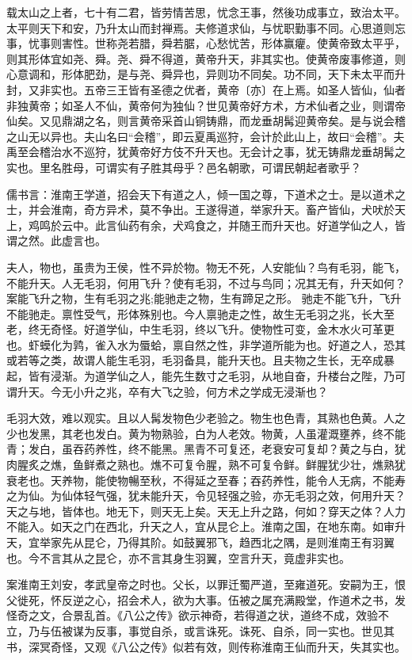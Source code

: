 \documentclass[]{article}
\begin{document}
载太山之上者，七十有二君，皆劳情苦思，忧念王事，然後功成事立，致治太平。太平则天下和安，乃升太山而封禅焉。夫修道求仙，与忧职勤事不同。心思道则忘事，忧事则害性。世称尧若腊，舜若腒，心愁忧苦，形体赢癯。使黄帝致太平乎，则其形体宜如尧、舜。尧、舜不得道，黄帝升天，非其实也。使黄帝废事修道，则心意调和，形体肥劲，是与尧、舜异也，异则功不同矣。功不同，天下未太平而升封，又非实也。五帝三王皆有圣德之优者，黄帝〔亦〕在上焉。如圣人皆仙，仙者非独黄帝；如圣人不仙，黄帝何为独仙？世见黄帝好方术，方术仙者之业，则谓帝仙矣。又见鼎湖之名，则言黄帝采首山铜铸鼎，而龙垂胡髯迎黄帝矣。是与说会稽之山无以异也。夫山名曰``会稽''，即云夏禹巡狩，会计於此山上，故曰``会稽''。夫禹至会稽治水不巡狩，犹黄帝好方伎不升天也。无会计之事，犹无铸鼎龙垂胡髯之实也。里名胜母，可谓实有子胜其母乎？邑名朝歌，可谓民朝起者歌乎？

儒书言：淮南王学道，招会天下有道之人，倾一国之尊，下道术之士。是以道术之士，并会淮南，奇方异术，莫不争出。王遂得道，举家升天。畜产皆仙，犬吠於天上，鸡鸣於云中。此言仙药有余，犬鸡食之，并随王而升天也。好道学仙之人，皆谓之然。此虚言也。

夫人，物也，虽贵为王侯，性不异於物。物无不死，人安能仙？鸟有毛羽，能飞，不能升天。人无毛羽，何用飞升？使有毛羽，不过与鸟同；况其无有，升天如何？案能飞升之物，生有毛羽之兆;能驰走之物，生有蹄足之形。
驰走不能飞升，飞升不能驰走。禀性受气，形体殊别也。今人禀驰走之性，故生无毛羽之兆，长大至老，终无奇怪。好道学仙，中生毛羽，终以飞升。使物性可变，金木水火可革更也。虾蟆化为鹑，雀入水为蜃蛤，禀自然之性，非学道所能为也。好道之人，恐其或若等之类，故谓人能生毛羽，毛羽备具，能升天也。且夫物之生长，无卒成暴起，皆有浸渐。为道学仙之人，能先生数寸之毛羽，从地自奋，升楼台之陛，乃可谓升天。今无小升之兆，卒有大飞之验，何方术之学成无浸渐也？

毛羽大效，难以观实。且以人髯发物色少老验之。物生也色青，其熟也色黄。人之少也发黑，其老也发白。黄为物熟验，白为人老效。物黄，人虽灌溉壅养，终不能青；发白，虽吞药养性，终不能黑。黑青不可复还，老衰安可复却？黄之与白，犹肉腥炙之燋，鱼鲜煮之熟也。燋不可复令腥，熟不可复令鲜。鲜腥犹少壮，燋熟犹衰老也。天养物，能使物暢至秋，不得延之至春；吞药养性，能令人无病，不能寿之为仙。为仙体轻气强，犹未能升天，令见轻强之验，亦无毛羽之效，何用升天？天之与地，皆体也。地无下，则天无上矣。天无上升之路，何如？穿天之体？人力不能入。如天之门在西北，升天之人，宜从昆仑上。淮南之国，在地东南。如审升天，宜举家先从昆仑，乃得其阶。如鼓翼邪飞，趋西北之隅，是则淮南王有羽翼也。今不言其从之昆仑，亦不言其身生羽翼，空言升天，竟虚非实也。

案淮南王刘安，孝武皇帝之时也。父长，以罪迁蜀严道，至雍道死。安嗣为王，恨父徙死，怀反逆之心，招会术人，欲为大事。伍被之属充满殿堂，作道术之书，发怪奇之文，合景乱首。《八公之传》欲示神奇，若得道之状，道终不成，效验不立，乃与伍被谋为反事，事觉自杀，或言诛死。诛死、自杀，同一实也。世见其书，深冥奇怪，又观《八公之传》似若有效，则传称淮南王仙而升天，失其实也。
\end{document}

